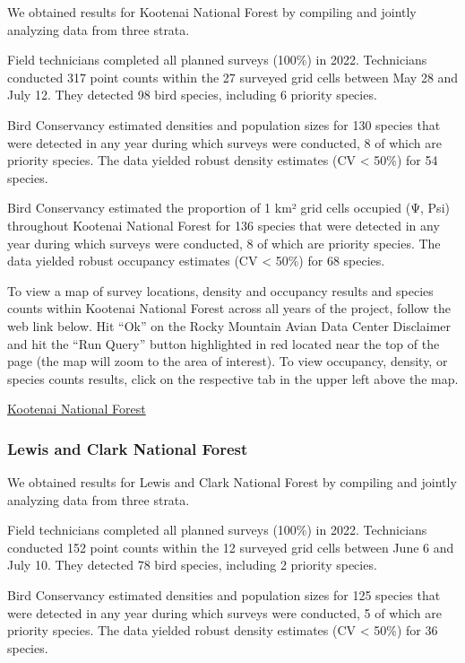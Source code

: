 \documentclass[
  letterpaper,
  DIV=11,
  numbers=noendperiod,
  oneside]{scrreprt}
\begin{document}
We obtained results for Kootenai National Forest by compiling and
jointly analyzing data from three strata.

Field technicians completed all planned surveys (100\%) in 2022.
Technicians conducted 317 point counts within the 27 surveyed grid cells
between May 28 and July 12. They detected 98 bird species, including 6
priority species.

Bird Conservancy estimated densities and population sizes for 130
species that were detected in any year during which surveys were
conducted, 8 of which are priority species. The data yielded robust
density estimates (CV \textless{} 50\%) for 54 species.

Bird Conservancy estimated the proportion of 1 km² grid cells occupied
(Ψ, Psi) throughout Kootenai National Forest for 136 species that were
detected in any year during which surveys were conducted, 8 of which are
priority species. The data yielded robust occupancy estimates (CV
\textless{} 50\%) for 68 species.

To view a map of survey locations, density and occupancy results and
species counts within Kootenai National Forest across all years of the
project, follow the web link below. Hit ``Ok'' on the Rocky Mountain
Avian Data Center Disclaimer and hit the ``Run Query'' button
highlighted in red located near the top of the page (the map will zoom
to the area of interest). To view occupancy, density, or species counts
results, click on the respective tab in the upper left above the map.

\href{http://www.rmbo.org/new_site/adc/QueryWindow.aspx\#N4IgzgrgDgpgTmALnAhoiBbEAuABCAaQHsjEYA7FAS1wDk0qjKAbXAMSLhiRAF8g}{Kootenai
National Forest}

\hypertarget{lewis-and-clark-national-forest}{%
\subsubsection{Lewis and Clark National
Forest}\label{lewis-and-clark-national-forest}}

We obtained results for Lewis and Clark National Forest by compiling and
jointly analyzing data from three strata.

Field technicians completed all planned surveys (100\%) in 2022.
Technicians conducted 152 point counts within the 12 surveyed grid cells
between June 6 and July 10. They detected 78 bird species, including 2
priority species.

Bird Conservancy estimated densities and population sizes for 125
species that were detected in any year during which surveys were
conducted, 5 of which are priority species. The data yielded robust
density estimates (CV \textless{} 50\%) for 36 species.
\end{document}
